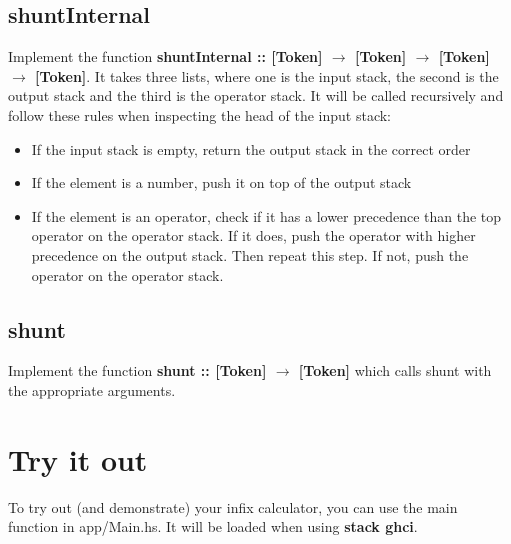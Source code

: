 \documentclass{article}
\begin{document}
\subsection{shuntInternal}
Implement the function \textbf{shuntInternal :: [Token] $\rightarrow$ [Token] $\rightarrow$ [Token] $\rightarrow$ [Token]}. It takes three lists, where one is the input stack, the second is the output stack and the third is the operator stack. It will be called recursively and follow these rules when inspecting the head of the input stack:
\begin{itemize}
    \item If the input stack is empty, return the output stack in the correct order
    \item If the element is a number, push it on top of the output stack
    \item If the element is an operator, check if it has a lower precedence than the top operator on the operator stack. If it does, push the operator with higher precedence on the output stack. Then repeat this step. If not, push the operator on the operator stack.
\end{itemize}

\subsection{shunt}
Implement the function \textbf{shunt :: [Token] $\rightarrow$ [Token]} which calls shunt with the appropriate arguments.

\section{Try it out}
To try out (and demonstrate) your infix calculator, you can use the main function in app/Main.hs. It will be loaded when using \textbf{stack ghci}.
\end{document}
